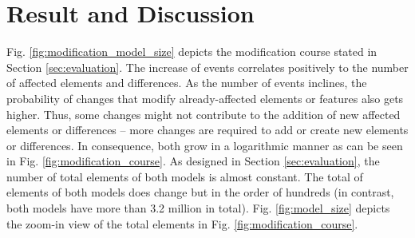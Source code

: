 \documentclass{jot}
\begin{document}
\section{Result and Discussion}
\label{sec:discussion}

Fig. \ref{fig:modification_model_size} depicts the modification course stated in Section \ref{sec:evaluation}. The increase of events correlates positively to the number of affected elements and differences. As the number of events inclines, the probability of changes that modify already-affected elements or features also gets higher. Thus, some changes might not contribute to the addition of new affected elements or differences -- more changes are required to add or create new elements or differences. In consequence, both grow in a logarithmic manner as can be seen in Fig. \ref{fig:modification_course}. As designed in Section \ref{sec:evaluation}, the number of total elements of both models is almost constant. The total of elements of both models does change but in the order of hundreds (in contrast, both models have more than 3.2 million in total). Fig. \ref{fig:model_size} depicts the zoom-in view of the total elements in Fig. \ref{fig:modification_course}.
\end{document}
